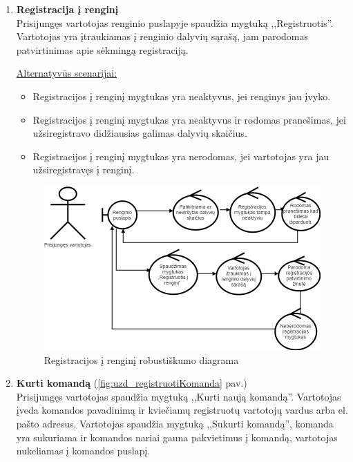 \documentclass{VUMIFPSkursinis}
\begin{document}
\begin{enumerate} [label = \textbf{U\arabic*.}]
			\item \textbf{Registracija į renginį} \\
					Prisijungęs vartotojas renginio puslapyje spaudžia mygtuką ,,Registruotis''. Vartotojas yra įtraukiamas į renginio dalyvių sąrašą, jam parodomas patvirtinimas apie sėkmingą registraciją.
					
				\underline{Alternatyvūs scenarijai:}
				\begin{itemize}
						\item Registracijos į renginį mygtukas yra neaktyvus, jei renginys jau įvyko.
						\item Registracijos į renginį mygtukas yra neaktyvus ir rodomas pranešimas, jei užsiregistravo didžiausias galimas dalyvių skaičius.
						\item Registracijos į renginį mygtukas yra nerodomas, jei vartotojas yra jau užsiregistravęs į renginį.
				\end{itemize}
				
				\begin{figure}[H]
					\centering
					\includegraphics[width=\textwidth]{img/PSI5/U9.png}
					\caption{Registracijos į renginį robustiškumo diagrama}
					\label{draw:u9}
				\end{figure}
				
			\item \textbf{Kurti komandą} (\ref{fig:uzd_registruotiKomanda} pav.)\\
				Prisijungęs vartotojas  spaudžia mygtuką ,,Kurti naują komandą''. Vartotojas įveda komandos pavadinimą ir kviečiamų registruotų vartotojų vardus arba el. pašto adresus. Vartotojas spaudžia mygtuką ,,Sukurti komandą'', komanda yra sukuriama ir komandos nariai gauna pakvietimus į komandą, vartotojas nukeliamas į komandos puslapį.
			

\end{enumerate}
\end{document}
